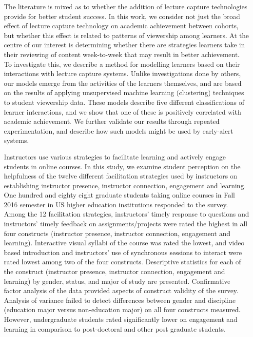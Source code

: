The literature is mixed as to whether the addition of lecture capture technologies provide for better student success. In this work, we consider not just the broad effect of lecture capture technology on academic achievement between cohorts, but whether this effect is related to patterns of viewership among learners. At the centre of our interest is determining whether there are strategies learners take in their reviewing of content week-to-week that may result in better achievement. To investigate this, we describe a method for modelling learners based on their interactions with lecture capture systems. Unlike investigations done by others, our models emerge from the activities of the learners themselves, and are based on the results of applying unsupervised machine learning (clustering) techniques to student viewership data. These models describe five different classifications of learner interactions, and we show that one of these is positively correlated with academic achievement. We further validate our results through repeated experimentation, and describe how such models might be used by early-alert systems.\cite{Brooks2014}


Instructors use various strategies to facilitate learning and actively engage students in online courses. In this study, we examine student perception on the helpfulness of the twelve different facilitation strategies used by instructors on establishing instructor presence, instructor connection, engagement and learning. One hundred and eighty eight graduate students taking online courses in Fall 2016 semester in US higher education institutions responded to the survey. Among the 12 facilitation strategies, instructors' timely response to questions and instructors' timely feedback on assignments/projects were rated the highest in all four constructs (instructor presence, instructor connection, engagement and learning). Interactive visual syllabi of the course was rated the lowest, and video based introduction and instructors' use of synchronous sessions to interact were rated lowest among two of the four constructs. Descriptive statistics for each of the construct (instructor presence, instructor connection, engagement and learning) by gender, status, and major of study are presented. Confirmative factor analysis of the data provided aspects of construct validity of the survey. Analysis of variance failed to detect differences between gender and discipline (education major versus non-education major) on all four constructs measured. However, undergraduate students rated significantly lower on engagement and learning in comparison to post-doctoral and other post graduate students.\cite{Martin2018}


